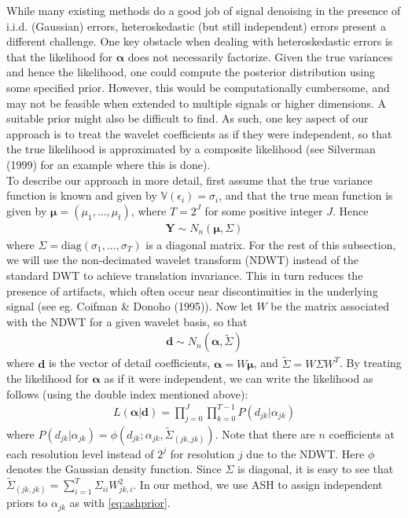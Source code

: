 \documentclass[12pt]{article}
\newcommand{\Ga}{\alpha}
\newcommand{\Ge}{\epsilon}
\newcommand{\s}{\sigma}
\begin{document}
While many existing methods do a good job of signal denoising in the presence of i.i.d. (Gaussian) errors, heteroskedastic (but still independent) errors present a different challenge. One key obstacle when dealing with heteroskedastic errors is that the likelihood for $\bm{\Ga}$ does not necessarily factorize. Given the true variances and hence the likelihood, one could compute the posterior distribution using some specified prior. However, this would be computationally cumbersome, and may not be feasible when extended to multiple signals or higher dimensions. A suitable prior might also be difficult to find. As such, one key aspect of our approach is to treat the wavelet coefficients as if they were independent, so that the true likelihood is approximated by a composite likelihood (see Silverman (1999) for an example where this is done).\bigskip\\
To describe our approach in more detail, first assume that the true variance function is known and given by $\mathbb{V}(\Ge_i)=\s_i$, and that the true mean function is given by $\bm{\mu}=(\mu_1,...,\mu_t)$, where $T=2^J$ for some positive integer $J$. Hence
\begin{eqnarray}
\bm{Y}\sim N_n(\bm{\mu},\Sigma)
\end{eqnarray}
where $\Sigma=\textrm{diag}(\s_1,...,\s_T)$ is a diagonal matrix. For the rest of this subsection, we will use the non-decimated wavelet transform (NDWT) instead of the standard DWT to achieve translation invariance. This in turn reduces the presence of artifacts, which often occur near discontinuities in the underlying signal (see eg. Coifman \& Donoho (1995)). Now let $W$ be the matrix associated with the NDWT for a given wavelet basis, so that
\begin{eqnarray}
\bm{d}\sim N_n(\bm{\Ga},\tilde{\Sigma})
\end{eqnarray}
where $\bm{d}$ is the vector of detail coefficients, $\bm{\Ga}=W\bm{\mu}$, and $\tilde{\Sigma}=W\Sigma W^T$. By treating the likelihood for $\bm{\Ga}$ as if it were independent, we can write the likelihood as follows (using the double index mentioned above):
\begin{eqnarray}\label{eq:likelihood}
L(\bm{\Ga}|\bm{d})=\prod_{j=0}^J\prod_{k=0}^{T-1}P(d_{jk}|\Ga_{jk})
\end{eqnarray}
where $P(d_{jk}|\Ga_{jk})=\phi(d_{jk};\Ga_{jk},\tilde{\Sigma}_{(jk,jk)})$. Note that there are $n$ coefficients at each resolution level instead of $2^j$ for resolution $j$ due to the NDWT. Here $\phi$ denotes the Gaussian density function. Since $\Sigma$ is diagonal, it is easy to see that $\tilde{\Sigma}_{(jk,jk)}=\sum_{i=1}^T \Sigma_{ii}W_{jk,i}^2$. In our method, we use ASH to assign independent priors to $\Ga_{jk}$ as with \eqref{eq:ashprior}. %
\end{document}
